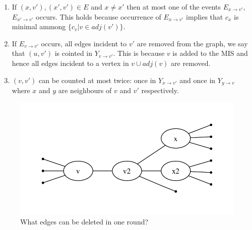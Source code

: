 \begin{pr}
\begin{enumerate}
\item If $(x,v'),(x',v') \in E$ and $x\neq x'$ then at most one of the events $E_{x\rightarrow v'}$, $E_{x'\rightarrow v'}$ occurs. This holds because occurrence of $E_{x\rightarrow v'} $ implies that $c_x$ is minimal ammong $\{c_v|v\in adj(v')\}$.
\item If $E_{v\rightarrow v'}$ occurs, all edges incident to $v'$ are removed from the graph, we say that $(u,v')$ is cointed in $Y_{v\rightarrow v'}$. This is because $v$ is added to the MIS and hence all edges incident to a vertex in $v\cup adj(v)$ are removed.
\item $(v,v')$ can be counted at most twice: once in $Y_{x\rightarrow v'}$ and once in $Y_{y\rightarrow v}$ where $x$ and $y$ are neighbours of $v$ and $v'$ respectively.
\end{enumerate}


\begin{figure}
\begin{center}
\includegraphics{./images/randomized_matching_delete_edge}
\end{center}
\caption{What edges can be deleted in one round?}
\label{fig:at_least_half}
\end{figure}
\end{pr}


